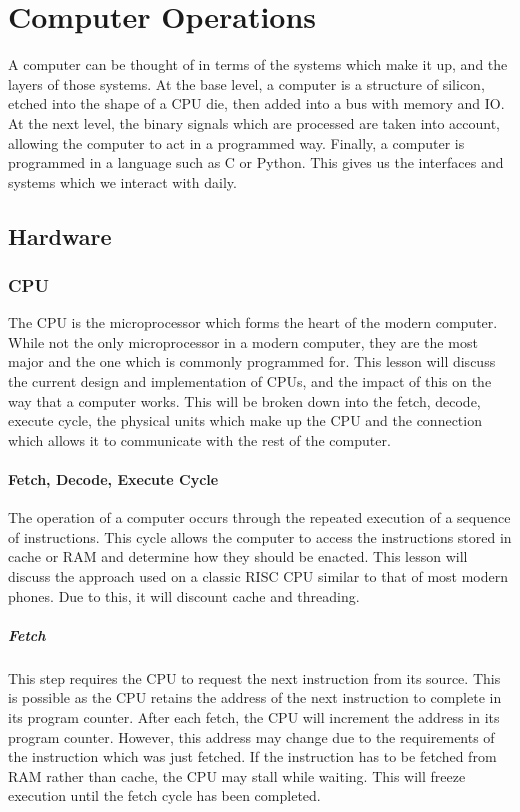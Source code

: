 \chapter{Computer Operations}
	\label{ch:ComputerOperations}
	A computer can be thought of in terms of the systems which make it up, and the layers of those systems.
	At the base level, a computer is a structure of silicon, etched into the shape of a CPU die, then added into a bus with memory and IO.
	At the next level, the binary signals which are processed are taken into account, allowing the computer to act in a programmed way.
	Finally, a computer is programmed in a language such as C or Python. This gives us the interfaces and systems which we interact with daily.
	\section{Hardware}
		\subsection{CPU}
			The CPU is the microprocessor which forms the heart of the modern computer.
			While not the only microprocessor in a modern computer, they are the most major and the one which is commonly programmed for.
			This lesson will discuss the current design and implementation of CPUs, and the impact of this on the way that a computer works.
			This will be broken down into the fetch, decode, execute cycle, the physical units which make up the CPU and the connection which allows it to communicate with the rest of the computer.
			\subsubsection{Fetch, Decode, Execute Cycle}
				The operation of a computer occurs through the repeated execution of a sequence of instructions.
				This cycle allows the computer to access the instructions stored in cache or RAM and determine how they should be enacted. This lesson will discuss the approach used on a classic RISC CPU similar to that of most modern phones.
				Due to this, it will discount cache and threading.
				\paragraph{Fetch}
					This step requires the CPU to request the next instruction from its source.
					This is possible as the CPU retains the address of the next instruction to complete in its program counter.
					After each fetch, the CPU will increment the address in its program counter.
					However, this address may change due to the requirements of the instruction which was just fetched.
					If the instruction has to be fetched from RAM rather than cache, the CPU may stall while waiting.
					This will freeze execution until the fetch cycle has been completed.
